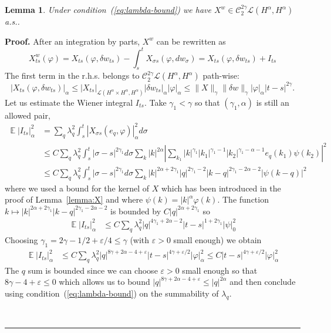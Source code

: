 \documentclass[a4paper,11pt,reqno]{article}
\DeclareMathOperator{\expect}{{\mathbb E}}
\newcommand{\eps}{\varepsilon}
\newcommand{\der}{\delta}
\newcommand{\CC}{\mathcal{C}}
\newcommand{\LL}{\mathcal{L}}
\newtheorem{lemma}[theorem]{Lemma}
\newenvironment{proof}[1][Proof]{\textbf{#1.} }{\ \rule{0.5em}{0.5em}}
\begin{document}
\begin{lemma}
\label{lemma:Xw}
Under condition~(\ref{eq:lambda-bound})
we have $X^w \in \CC^{2\gamma}_2 \LL(H^\alpha,H^\alpha)$ a.s..
\end{lemma}
\begin{proof}
After an integration by parts, $X^w$ can be rewritten as
\begin{equation}
  \label{eq:Xw-2}
  X^w_{ts}(\varphi) = X_{ts}(\varphi,\der w_{ts}) - \int_s^t X_{\sigma
  s}(\varphi,dw_\sigma) = X_{ts}(\varphi,\der w_{ts}) + I_{ts} 
\end{equation}
The first term in the r.h.s. belongs to $\CC_2^{2\gamma}
\LL(H^\alpha,H^\alpha)$ path-wise:
$$
|X_{ts}(\varphi,\der w_{ts})|_{\alpha} \le
|X_{ts}|_{\LL(H^\alpha\times H^\alpha,H^\alpha)} |\der w_{ts}|_\alpha
|\varphi|_\alpha \le 
\|X\|_\gamma \|\der
w\|_\gamma |\varphi|_\alpha |t-s|^{2\gamma}.
$$
Let us estimate the Wiener integral $I_{ts}$. Take $\gamma_1 < \gamma$ so that $(\gamma_1,\alpha)$ is still an allowed pair,
\begin{equation*}
  \begin{split}
\expect \left|I_{ts}\right|^2_\alpha & = 
\sum_q \lambda_q^2 \int_s^t |X_{\sigma s}(e_q,\varphi)|_\alpha^2
d\sigma
\\ & \le C \sum_q \lambda_q^2 \int_s^t |\sigma-s|^{2\gamma_1} d\sigma \sum_k
|k|^{2\alpha}
\left|\sum_{k_1} |k|^{\gamma_1} |k_1|^{\gamma_1-1} |k_2|^{\gamma_1-\alpha-1}
  e_q(k_1) \psi(k_2)\right|^2    
\\ & \le C \sum_q \lambda_q^2 \int_s^t |\sigma-s|^{2\gamma_1} d\sigma \sum_k
|k|^{2\alpha+2\gamma_1} |q|^{2\gamma_1-2} |k-q|^{2\gamma_1-2\alpha-2}
  |\psi(k-q)|^2    
  \end{split}
\end{equation*}
where we used a bound for the kernel of $X$ which has been introduced
in the proof of Lemma~\ref{lemma:X} and where $\psi(k) =
|k|^{\alpha}\varphi(k)$. 
The function $k \mapsto
|k|^{2\alpha+2\gamma_1} |k-q|^{2\gamma_1-2\alpha-2}$ is bounded by $C
|q|^{2\alpha+2\gamma_1}$ so 
\begin{equation*}
  \begin{split}
\expect \left|I_{ts}\right|^2_\alpha &  \le C \sum_q \lambda_q^2  |q|^{4\gamma_1+2\alpha-2} 
|t-s|^{1+2\gamma_1} |\psi|_0^2
  \end{split}
\end{equation*}
Choosing $\gamma_1 = 2\gamma-1/2+\eps/4\le \gamma$ (with $\eps>0$ small enough) we obtain
\begin{equation*}
  \begin{split}
\expect \left|I_{ts}\right|^2_\alpha &  \le C \sum_q \lambda_q^2  |q|^{8\gamma+2\alpha-4+\eps} 
|t-s|^{4\gamma+\eps/2} |\varphi|_\alpha^2  \le C |t-s|^{4\gamma+\eps/2} |\varphi|_\alpha^2
  \end{split}
\end{equation*}
The $q$ sum is bounded
since we can choose $\eps>0$ small enough so that $8\gamma-4+\eps \le
0$ which allows us to bound $|q|^{8\gamma+2\alpha-4+\eps}  \le
|q|^{2\alpha}$ and then conclude using
condition~(\ref{eq:lambda-bound}) on the summability of $\lambda_q$.


\end{proof}
\end{document}
